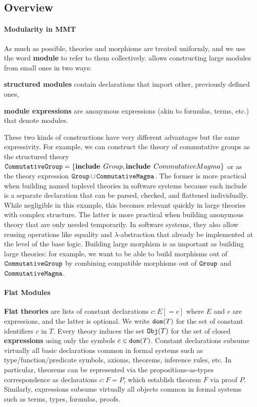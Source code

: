 \subsection{Overview}

\begin{modexp}
\paragraph{Modularity in MMT}
As much as possible, theories and morphisms are treated uniformly, and we use the word \textbf{module} to refer to them collectively.
\mmt allows constructing large modules from small ones in two ways:
\begin{compactitem}
  \item \textbf{structured modules} contain declarations that import other, previously defined ones,
  \item \textbf{module expressions} are anonymous expressions (akin to formulas, terms, etc.) that denote modules.
\end{compactitem}

These two kinds of constructions have very different advantages but the same expressivity.
For example, we can construct the theory of commutative groups as the structured theory $\operatorname{\mathtt{CommutativeGroup}}=\{\operatorname{\mathbf{include}}{\;Group},\operatorname{\mathbf{include}}{\;CommutativeMagma}\}$ or as the theory expression $\operatorname{\mathtt{Group}}\cup\operatorname{\mathtt{CommutativeMagma}}$.
The former is more practical when building named toplevel theories in software systems because each include is a separate declaration that can be parsed, checked, and flattened individually.
While negligible in this example, this becomes relevant quickly in large theories with complex structure.
The latter is more practical when building anonymous theory that are only needed temporarily.
In software systems, they also allow reusing operations like equality and $\lambda$-abstraction that already be implemented at the level of the base logic.
Building large morphism is as important as building large theories: for example, we want to be able to build morphisms out of $\operatorname{\mathtt{CommutativeGroup}}$ by combining compatible morphisms out of $\operatorname{\mathtt{Group}}$ and $\operatorname{\mathtt{CommutativeMagma}}$.
\end{modexp}

\paragraph{Flat Modules}
\textbf{Flat theories} are lists of constant declarations $c:E[=e]$ where $E$ and $e$ are expressions, and the latter is optional.
We write $\mathtt{dom}(T)$ for the set of constant identifiers $c$ in $T$.
Every theory induces the set $\mathtt{Obj}(T)$ for the set of closed \textbf{expressions} using only the symbols $c\in\mathtt{dom}(T)$.
Constant declarations subsume virtually all basic declarations common in formal systems such as type/function/predicate symbols, axioms, theorems, inference rules, etc.
In particular, theorems can be represented via the propositions-as-types correspondence as declarations $c:F=P$, which establish theorem $F$ via proof $P$.
Similarly, \mmt expressions subsume virtually all objects common in formal systems such as terms, types, formulas, proofs.

